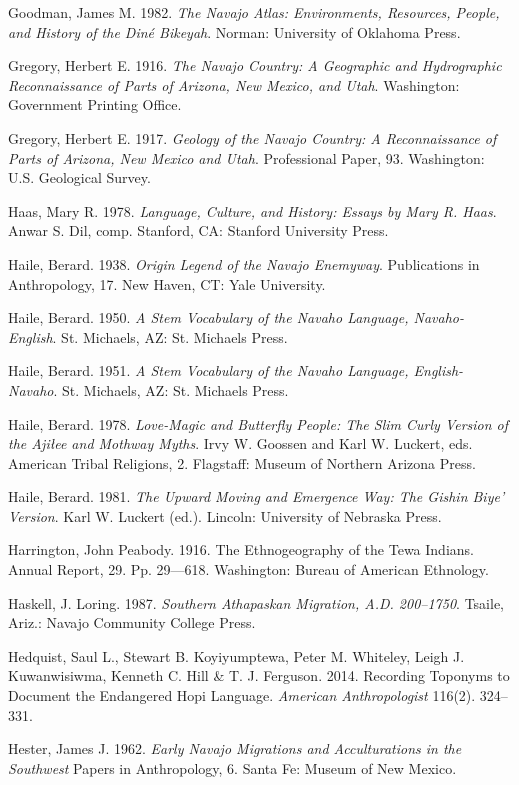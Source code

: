Goodman, James M.  1982. \textit{The Navajo Atlas: Environments, Resources, People, and History of the Diné Bikeyah}.  Norman:  University of Oklahoma Press.

Gregory, Herbert E.  1916. \textit{The Navajo Country: A Geographic and Hydrographic Reconnaissance of Parts of Arizona, New Mexico, and Utah}.  Washington:  Government Printing Office.

Gregory, Herbert E. 1917.  \textit{Geology of the Navajo Country: A Reconnaissance of Parts of Arizona, New Mexico and Utah}.  Professional Paper, 93.  Washington:  U.S. Geological Survey.

Haas, Mary R.  1978. \textit{Language, Culture, and History: Essays by Mary R. Haas}.  Anwar S. Dil, comp.  Stanford, CA:  Stanford University Press.

Haile, Berard. 1938. \textit{\textit{Origin Legend of the Navajo Enemyway}}.  Publications in Anthropology, 17.  New Haven, CT:  Yale University.

Haile, Berard. 1950. \textit{A Stem Vocabulary of the Navaho Language, Navaho-English}.  St. Michaels, AZ:  St. Michaels Press.

Haile, Berard. 1951. \textit{A Stem Vocabulary of the Navaho Language, English-Navaho}.  St. Michaels, AZ:  St. Michaels Press.

Haile, Berard. 1978. \textit{Love-Magic and Butterfly People: The Slim Curly Version of the Ajiłee and Mothway Myths}.  Irvy W. Goossen and Karl W. Luckert, eds.  American Tribal Religions, 2.  Flagstaff:  Museum of Northern Arizona Press.

Haile, Berard. 1981. \textit{The Upward Moving and Emergence Way: The Gishin Biye’ Version}.  Karl W. Luckert (ed.). Lincoln:  University of Nebraska Press.

Harrington, John Peabody. 1916.  The Ethnogeography of the Tewa Indians.  Annual Report, 29.  Pp. 29---618.  Washington:  Bureau of American Ethnology.

Haskell, J. Loring. 1987. \textit{Southern Athapaskan Migration, A.D. 200--1750}.  Tsaile, Ariz.:  Navajo Community College Press.

Hedquist, Saul L., Stewart B. Koyiyumptewa, Peter M. Whiteley, Leigh J. Kuwanwisiwma, Kenneth C. Hill \& T. J. Ferguson. 2014.  Recording Toponyms to Document the Endangered Hopi Language.  \textit{American Anthropologist} 116(2). 324--331.

Hester, James J.  1962. \textit{Early Navajo Migrations and Acculturations in the Southwest}  Papers in Anthropology, 6.  Santa Fe:  Museum of New Mexico.

